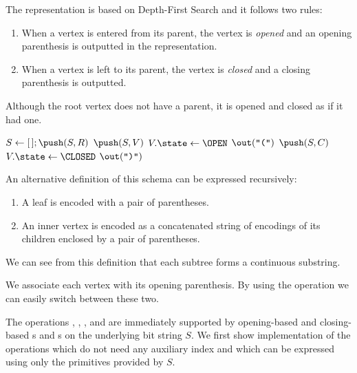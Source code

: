 The representation is based on Depth-First Search and it follows two rules:
\begin{enumerate}
	\item When a vertex is entered from its parent, the vertex is \emph{opened} and an opening parenthesis is outputted in the representation.
	\item When a vertex is left to its parent, the vertex is \emph{closed} and a closing parenthesis is outputted.
\end{enumerate}
Although the root vertex does not have a parent, it is opened and closed as if it had one.

\begin{algorithm}
\begin{algorithmic}
	\State $S \gets [\,]; \push(S, R)$ 
		 
			\State $\push(S, V)$ 
			\State $V.\state \gets \OPEN$
			\State $\out(\openingParen)$
				\State $\push(S, C)$
			\EndFor
		 
			\State $V.\state \gets \CLOSED$
			\State $\out(\closingParen)$
		\EndIf
	\EndWhile
\EndFunction
\end{algorithmic}
\end{algorithm}

An alternative definition of this schema can be expressed recursively:
\begin{enumerate}
	\item A leaf is encoded with a pair of parentheses.
	\item An inner vertex is encoded as a concatenated string of encodings of its children enclosed by a pair of parentheses.
\end{enumerate}
We can see from this definition that each subtree forms a continuous substring.

\bigbreak

We associate each vertex with its opening parenthesis.
By using the operation \match{} we can easily switch between these two.

The operations \preRank{}, \preSelect{}, \postRank{}, and \postSelect{} are immediately supported by opening-based and closing-based \rank{}s and \select{}s on the underlying bit string $S$.
We first show implementation of the operations which do not need any auxiliary index and which can be expressed using only the primitives provided by $S$.

